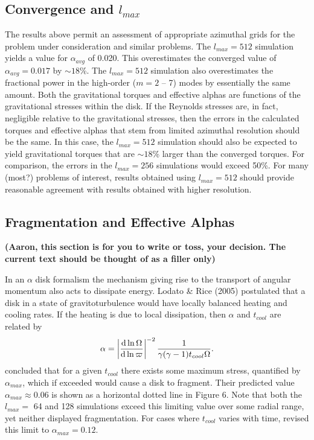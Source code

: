 \documentclass[manuscript]{aastex} %
\begin{document}
\subsection{Convergence and $l_{max}$}

The results above permit an assessment of appropriate azimuthal grids for the
problem under consideration and similar problems.  The $l_{max} = 512$ simulation yields a value 
for $\alpha_{avg}$ of 0.020.  This  overestimates the converged value of $\alpha_{avg}
= 0.017$ by $\sim 18$\%.  The $l_{max} = 512$ simulation also overestimates the fractional
power in the high-order ($m = 2$ -- 7) modes by essentially the same amount.
Both the gravitational torques and effective alphas are functions of the
gravitational stresses within the disk.  If the Reynolds stresses are, in fact, negligible relative to the gravitational stresses,
then the errors in the calculated torques and effective alphas that stem from limited azimuthal resolution 
should be the same.   In this case, the  $l_{max} = 512$ simulation should also be expected to yield
gravitational torques that are $\sim 18$\% larger than the converged torques.  For comparison, the
errors in the $l_{max} = 256$ simulations would exceed 50\%.   For many (most?) problems of interest,
results obtained using $l_{max} = 512$ should provide reasonable agreement with results obtained 
with higher resolution.

\subsection{Fragmentation and Effective Alphas}

\noindent
{\bf (Aaron, this section is for you to write or toss, your decision.  The current text should be thought of as a filler only)}

In an $\alpha$ disk formalism the mechanism giving rise to the transport of angular momentum also acts to dissipate energy. Lodato \& Rice (2005) postulated that a disk in a state of gravitoturbulence would have locally balanced heating and cooling rates. If the heating is due to local dissipation, then $\alpha$ and $t_{cool}$ are related by
\begin{equation}
\alpha = \left| \frac{{\rm d}\ln \Omega}{{\rm d} \ln \varpi} \right|^{-2}
\frac{1}{\gamma(\gamma - 1) t_{cool}\Omega}.
\end{equation}
\citet{rice2005} concluded that for a given $t_{cool}$  there exists some maximum stress, quantified by $\alpha_{max}$, which if exceeded would cause a disk to fragment. Their predicted value $\alpha_{max} \approx 0.06$ is shown as a horizontal dotted line in Figure 6.  Note that both the $l_{max} = $ 64 and 128 simulations exceed this limiting value over some radial range, yet neither displayed fragmentation. For cases where $t_{cool}$  varies with time, \citet{clarke2007} revised this limit to $\alpha_{max} = 0.12$. 
\end{document}
